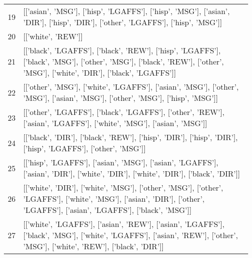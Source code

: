 \begin{tabular}{rl}
19 & [['asian', 'MSG'], ['hisp', 'LGAFFS'], ['hisp', 'MSG'], ['asian', 'DIR'], ['hisp', 'DIR'], ['other', 'LGAFFS'], ['hisp', 'MSG']] \\
20 & [['white', 'REW']] \\
21 & [['black', 'LGAFFS'], ['black', 'REW'], ['hisp', 'LGAFFS'], ['black', 'MSG'], ['other', 'MSG'], ['black', 'REW'], ['other', 'MSG'], ['white', 'DIR'], ['black', 'LGAFFS']] \\
22 & [['other', 'MSG'], ['white', 'LGAFFS'], ['asian', 'MSG'], ['other', 'MSG'], ['asian', 'MSG'], ['other', 'MSG'], ['hisp', 'MSG']] \\
23 & [['other', 'LGAFFS'], ['black', 'LGAFFS'], ['other', 'REW'], ['asian', 'LGAFFS'], ['white', 'MSG'], ['asian', 'MSG']] \\
24 & [['black', 'DIR'], ['black', 'REW'], ['hisp', 'DIR'], ['hisp', 'DIR'], ['hisp', 'LGAFFS'], ['other', 'MSG']] \\
25 & [['hisp', 'LGAFFS'], ['asian', 'MSG'], ['asian', 'LGAFFS'], ['asian', 'DIR'], ['white', 'DIR'], ['white', 'DIR'], ['black', 'DIR']] \\
26 & [['white', 'DIR'], ['white', 'MSG'], ['other', 'MSG'], ['other', 'LGAFFS'], ['white', 'MSG'], ['asian', 'DIR'], ['other', 'LGAFFS'], ['asian', 'LGAFFS'], ['black', 'MSG']] \\
27 & [['white', 'LGAFFS'], ['asian', 'REW'], ['asian', 'LGAFFS'], ['black', 'MSG'], ['white', 'LGAFFS'], ['asian', 'REW'], ['other', 'MSG'], ['white', 'REW'], ['black', 'DIR']] \\
\bottomrule
\end{tabular}
